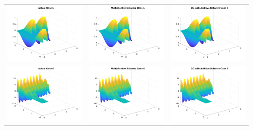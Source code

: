 \documentclass[11pt]{article}
\theoremstyle{definition}
\theoremstyle{remark}
\theoremstyle{plain}
\begin{document}
\begin{center}
\begin{tabular}{ccc}
    \includegraphics[width=0.3\linewidth]{../Figures/final_3_actual_5.png}&\includegraphics[width=0.3\linewidth]{../Figures/final_3_mult_5.png}&\includegraphics[width=0.3\linewidth]{../Figures/final_3_pcg_5.png}\\
    \includegraphics[width=0.3\linewidth]{../Figures/final_3_actual_6.png}&\includegraphics[width=0.3\linewidth]{../Figures/final_3_mult_6.png}&\includegraphics[width=0.3\linewidth]{../Figures/final_3_pcg_6.png}\\
  \end{tabular}
\end{center}
\end{document}
